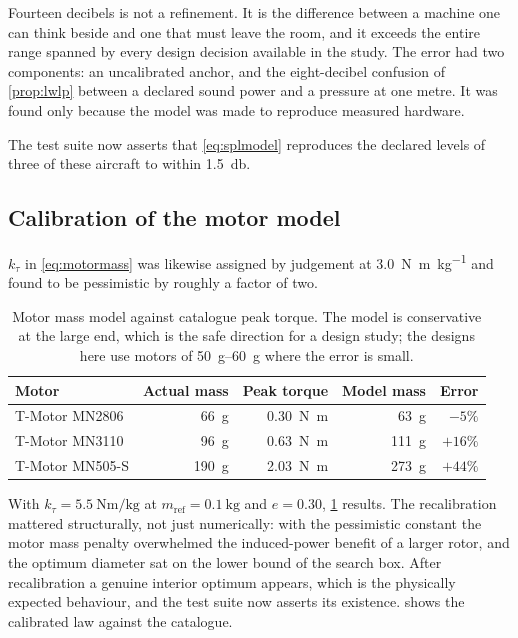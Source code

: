 \begin{finding}
Fourteen decibels is not a refinement. It is the difference between a machine
one can think beside and one that must leave the room, and it exceeds the
entire range spanned by every design decision available in the study. The error
had two components: an uncalibrated anchor, and the eight-decibel confusion of
\cref{prop:lwlp} between a declared sound power and a pressure at one metre. It
was found only because the model was made to reproduce measured hardware.
\end{finding}

The test suite now asserts that \cref{eq:splmodel} reproduces the declared
levels of three of these aircraft to within \SI{1.5}{\decibel}.

\subsection{Calibration of the motor model}

$k_\tau$ in \cref{eq:motormass} was likewise assigned by judgement at
\SI{3.0}{\newton\metre\per\kilo\gram} and found to be pessimistic by roughly a
factor of two.

\begin{table}[t]
\centering
\caption{Motor mass model against catalogue peak torque. The model is
conservative at the large end, which is the safe direction for a design study;
the designs here use motors of \SIrange{50}{60}{\gram} where the error is
small.}
\label{tab:motor}
\begin{tabular}{@{}lrrrr@{}}
\toprule
Motor & Actual mass & Peak torque & Model mass & Error \\
\midrule
T-Motor MN2806  & \SI{66}{\gram}  & \SI{0.30}{\newton\metre} & \SI{63}{\gram}  & $-5\%$ \\
T-Motor MN3110  & \SI{96}{\gram}  & \SI{0.63}{\newton\metre} & \SI{111}{\gram} & $+16\%$ \\
T-Motor MN505-S & \SI{190}{\gram} & \SI{2.03}{\newton\metre} & \SI{273}{\gram} & $+44\%$ \\
\bottomrule
\end{tabular}
\end{table}

With $k_\tau = \SI{5.5}{\newton\metre\per\kilo\gram}$ at
$m_{\mathrm{ref}}=\SI{0.1}{\kilo\gram}$ and $e=0.30$, \cref{tab:motor} results.
The recalibration mattered structurally, not just numerically: with the
pessimistic constant the motor mass penalty overwhelmed the induced-power
benefit of a larger rotor, and the optimum diameter sat on the lower bound of
the search box. After recalibration a genuine interior optimum appears, which
is the physically expected behaviour, and the test suite now asserts its
existence.  shows the calibrated law against the catalogue.

